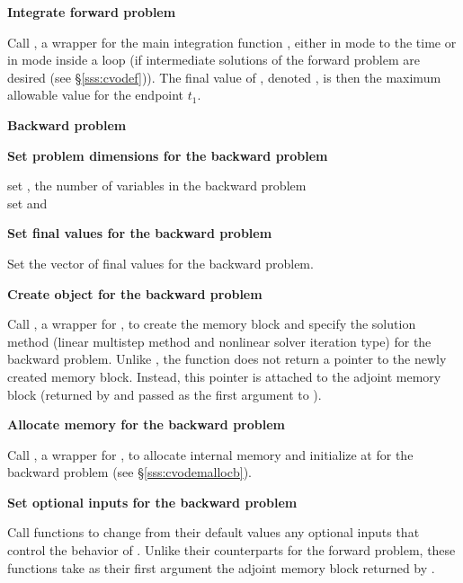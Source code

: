 \begin{Steps}
\item
  {\bf Integrate forward problem}

  Call , a wrapper for the {\cvodes} main integration
  function , either in  mode to the time 
   or in  mode inside a loop (if intermediate
  solutions of the forward problem are desired (see \S\ref{sss:cvodef})).
  The final value of , denoted , is then
  the maximum allowable value for the endpoint $t_1$.

  \vspace{0.2in}\centerline{\bf Backward problem}

\item \label{i:back_start}
  {\bf Set problem dimensions for the backward problem}

  {\s} set , the number of variables in the backward problem \\
  {\p} set  and 

\item
  {\bf Set final values for the backward problem}

  Set the vector  of final values for the backward problem.

\item
  {\bf Create {\cvodes} object for the backward problem}

  Call , a wrapper for , to
  create the {\cvodes} memory block and specify the solution method
  (linear multistep method and nonlinear solver iteration type) for
  the backward problem. Unlike , the function 
  does not return a pointer to the newly created memory block. Instead,
  this pointer is attached to the adjoint memory block (returned by
   and passed as the first argument to ).

\item
  {\bf Allocate memory for the backward problem}

  Call , a wrapper for , to 
  allocate internal memory and initialize {\cvodes} at  for 
  the backward problem (see \S\ref{sss:cvodemallocb}).

\item
  {\bf Set optional inputs for the backward problem}

  Call  functions to change from their default values
  any optional inputs that control the behavior of {\cvodes}. Unlike
  their counterparts for the forward problem, these functions take as
  their first argument the adjoint memory block returned by .


\end{Steps}
